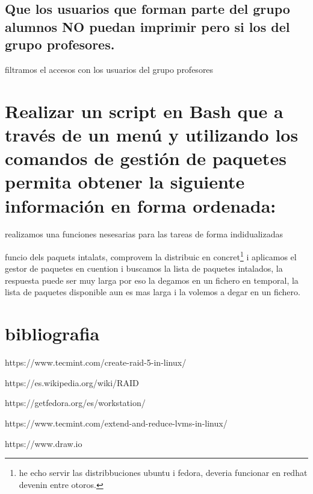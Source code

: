 \documentclass[preprint,11pt]{elsarticle}
\begin{document}
\subsection{Que los usuarios que forman parte del grupo alumnos NO puedan imprimir pero si los del grupo profesores.}
filtramos el accesos con los usuarios del grupo profesores 


\clearpage
\section{Realizar un script en Bash que a través de un menú y utilizando los comandos de gestión de paquetes permita obtener la siguiente información en forma ordenada:}

realizamos una funciones nesesarias para las tareas de forma indidualizadas\smallskip

funcio dels paquets intalats, comprovem la distribuic en concret\footnote{he echo servir las distribbuciones ubuntu i fedora, deveria funcionar en redhat devenin entre otoros.} i aplicamos el gestor de paquetes en cuention i buscamos la lista de paquetes intalados, la respuesta puede ser muy larga por eso la degamos en un fichero en temporal, la lista de paquetes disponible aun es mas larga i la volemos a degar en un fichero. 
\smallskip




\clearpage
\section{bibliografia}
https://www.tecmint.com/create-raid-5-in-linux/ \smallskip

https://es.wikipedia.org/wiki/RAID\smallskip

https://getfedora.org/es/workstation/\smallskip

https://www.tecmint.com/extend-and-reduce-lvms-in-linux/\smallskip

https://www.draw.io\smallskip
\end{document}
